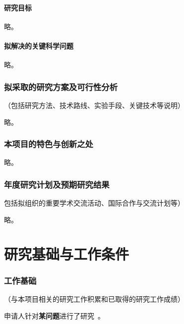 \documentclass[subfig]{mynsfc}
\begin{document}
\subsection{研究目标}

略。

\subsection{拟解决的关键科学问题}

略。

\section{拟采取的研究方案及可行性分析}
\label{sec:approach}

\begin{hcomment}
  （包括研究方法、技术路线、实验手段、关键技术等说明）
\end{hcomment}

略。

\section{本项目的特色与创新之处}
\label{sec:innovation}

略。

\section{年度研究计划及预期研究结果}
\label{sec:plan}

\begin{hcomment}
  包括拟组织的重要学术交流活动、国际合作与交流计划等）
\end{hcomment}

略。

\part{研究基础与工作条件}
\label{sec:preparation}


\section{工作基础}
\label{sec:previous-work}

\begin{hcomment}
  （与本项目相关的研究工作积累和已取得的研究工作成绩）
\end{hcomment}


\begin{refsection}

  申请人针对\textbf{某问题}进行了研究~\cite{xia_saliency_2015}。

  \printbibliography[prefixnumbers=J,heading=cvtype,title={相关工作}]

\end{refsection}
\end{document}
